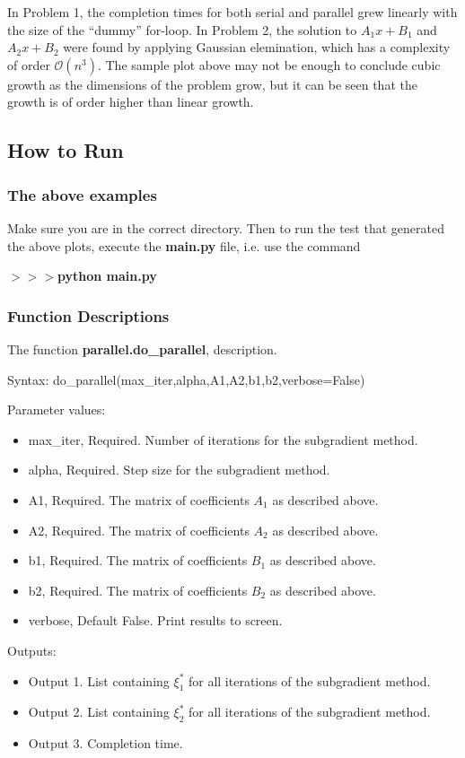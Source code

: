 \documentclass[12pt]{article}
\begin{document}
In Problem 1, the completion times for both serial and parallel grew linearly with the size of the ``dummy'' for-loop. In Problem 2, the solution to $A_1x+B_1$ and $A_2x+B_2$ were found by applying Gaussian elemination, which has a complexity of order $\mathcal{O}(n^3)$. The sample plot above may not be enough to conclude cubic growth as the dimensions of the problem grow, but it can be seen that the growth is of order higher than linear growth.


\subsection*{How to Run}

\subsubsection*{The above examples}

Make sure you are in the correct directory. Then to run the test that generated the above plots, execute the \textbf{main.py} file, i.e. use the command

\noindent \textbf{$>>>$python main.py}

\subsubsection*{Function Descriptions}

The function \textbf{parallel.do\_parallel}, description.

Syntax: do\_parallel(max\_iter,alpha,A1,A2,b1,b2,verbose=False)

Parameter values:
\begin{itemize}
	\item max\_iter, Required. Number of iterations for the subgradient method.
	\item alpha, Required. Step size for the subgradient method.
	\item A1, Required. The matrix of coefficients $A_1$ as described above.
	\item A2, Required. The matrix of coefficients $A_2$ as described above.
	\item b1, Required. The matrix of coefficients $B_1$ as described above.
	\item b2, Required. The matrix of coefficients $B_2$ as described above.
	\item verbose, Default False. Print results to screen.
\end{itemize}

Outputs:
\begin{itemize}
	\item Output 1. List containing $\xi_1^*$ for all iterations of the subgradient method.
	\item Output 2. List containing $\xi_2^*$ for all iterations of the subgradient method.
	\item Output 3. Completion time.
\end{itemize}
\end{document}
